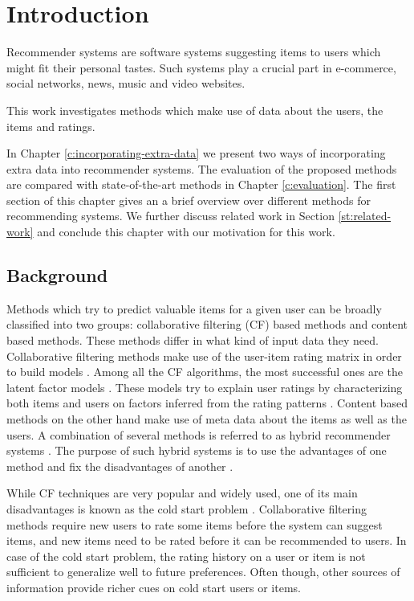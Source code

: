 \chapter{Introduction}
\label{c:introduction}

Recommender systems are software systems suggesting items to users which might fit their personal tastes.
Such systems play a crucial part in e-commerce, social networks, news, music and video websites.

This work investigates methods which make use of data about the users, the items and ratings.

In Chapter \ref{c:incorporating-extra-data} we present two ways of incorporating extra data into recommender systems.
The evaluation of the proposed methods are compared with state-of-the-art methods in Chapter \ref{c:evaluation}.
The first section of this chapter gives an a brief overview over different methods for recommending systems.
We further discuss related work in Section \ref{st:related-work} and conclude this chapter with our motivation for this work.

\section{Background}
\label{st:background}

Methods which try to predict valuable items for a given user can be broadly classified into two groups: collaborative filtering (CF) based methods and content based methods.
These methods differ in what kind of input data they need.
Collaborative filtering methods make use of the user-item rating matrix in order to build models \cite{Kabbur2014}.
Among all the CF algorithms, the most successful ones are the latent factor models \cite{Bao2014}.
These models try to explain user ratings by characterizing both items and users on factors inferred from the rating patterns \cite{Bao2014}.
Content based methods on the other hand make use of meta data about the items as well as the users.
A combination of several methods is referred to as hybrid recommender systems \cite{Ricci2011}.
The purpose of such hybrid systems is to use the advantages of one method and fix the disadvantages of another \cite{Ricci2011}.

While CF techniques are very popular and widely used, one of its main disadvantages is known as the cold start problem \cite{Christoffel2014}.
Collaborative filtering methods require new users to rate some items before the system can suggest items, and new items need to be rated before it can be recommended to users.
In case of the cold start problem, the rating history on a user or item is not sufficient to generalize well to future preferences.
Often though, other sources of information provide richer cues on cold start users or items.


